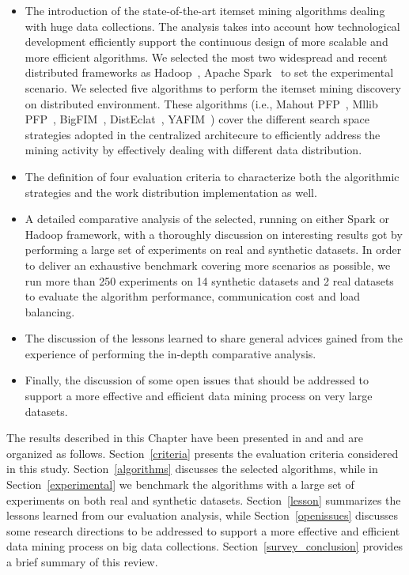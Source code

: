 \begin{itemize}
\item The introduction of the state-of-the-art itemset mining algorithms dealing
with huge data collections. The analysis takes into account how technological development efficiently
support the continuous design of more scalable and more efficient algorithms. We
selected the most two widespread and recent distributed frameworks as
Hadoop~\cite{HDFS}, Apache Spark~\cite{Zaharia_spark} to set the experimental
scenario. 
We selected five algorithms to
perform the itemset mining discovery on distributed environment. 	These
algorithms (i.e., Mahout PFP~\cite{Mahout}, Mllib PFP~\cite{MLLib},
BigFIM~\cite{bigfim}, DistEclat~\cite{bigfim}, YAFIM~\cite{YAFIM}) cover the
different search space strategies adopted in the centralized architecure to
efficiently address the mining activity by effectively dealing with different
data distribution.
\item
The definition of four evaluation criteria to characterize both the algorithmic
strategies and the work distribution implementation as well.
\item
A detailed comparative analysis of the selected, running on either Spark or
Hadoop framework, with a thoroughly discussion on interesting results got by
performing a large set of experiments on real and synthetic datasets.
In order to deliver an exhaustive benchmark covering more scenarios as possible, we run more than 250 experiments on 14 synthetic datasets and 2 real datasets to
evaluate the algorithm performance, communication cost and load balancing.
\item
The discussion of the lessons learned to share general advices gained from the
experience of performing the in-depth comparative analysis.
\item
Finally, the discussion of some open issues that should be addressed to support a more
effective and efficient data mining process on very large datasets.
\end{itemize}

The results described in this Chapter have been presented in \cite{apiletti2015review} and \cite{survey_pulvi} and are organized as follows. Section~\ref{criteria} presents the
evaluation criteria considered in this study. Section~\ref{algorithms} discusses
the selected algorithms, while in
Section~\ref{experimental} we benchmark the algorithms with a large set of
experiments on both real and synthetic datasets.
Section~\ref{lesson} summarizes the lessons learned from our evaluation
analysis, while Section~\ref{openissues} discusses some research directions to
be addressed to support a more effective and efficient data mining process on
big data collections. Section~\ref{survey_conclusion} provides a brief summary of this
review.


